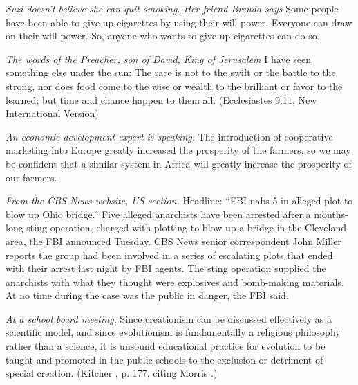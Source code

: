 %
\begin{exercises}
\item \textit{Suzi doesn't believe she can quit smoking. Her friend Brenda says} Some people have been able to give up cigarettes by using their will-power. Everyone can draw on their will-power. So, anyone who wants to give up cigarettes can do so.

\item \textit{The words of the Preacher, son of David, King of Jerusalem} I have seen something else under the sun: The race is not to the swift or the battle to the strong, nor does food come to the wise or wealth to the brilliant or favor to the learned; but time and chance happen to them all. (Ecclesiastes 9:11, New International Version)

\item \textit{An economic development expert is speaking.} The introduction of cooperative marketing into Europe greatly increased the prosperity of the farmers, so we may be confident that a similar system in Africa will greatly increase the prosperity of our farmers.

\item \textit{From the CBS News website, US section.} Headline: ``FBI nabs 5 in alleged plot to blow up Ohio bridge.'' Five alleged anarchists have been arrested after a months-long sting operation, charged with plotting to blow up a bridge in the Cleveland area, the FBI announced Tuesday. CBS News senior correspondent John Miller reports the group had been involved in a series of escalating plots that ended with their arrest last night by FBI agents. The sting operation supplied the anarchists with what they thought were explosives and bomb-making materials. At no time during the case was the public in danger, the FBI said. \citep{CBSNews2012}


\item \textit{At a school board meeting.} Since creationism can be discussed effectively as a scientific model, and since evolutionism is fundamentally a religious philosophy rather than a science, it is unsound educational practice for evolution to be taught and promoted in the public schools to the exclusion or detriment of special creation. (Kitcher \citeyear{Kitcher1982}, p. 177, citing Morris \citeyear{Morris1975}.)

\end{exercises}


